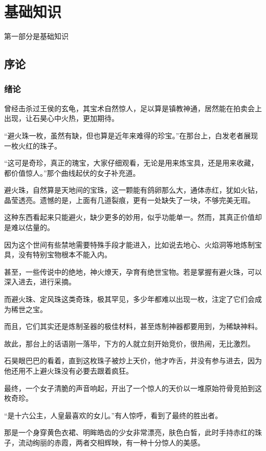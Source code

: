 \part{基础知识}

第一部分是基础知识

\chapter{序论}
\thispagestyle{empty}


\section{绪论}

曾经击杀过王侯的玄龟，其宝术自然惊人，足以算是镇教神通，居然能在拍卖会上出现，让石昊心中火热，更加期待。

“避火珠一枚，虽然有缺，但也算是近年来难得的珍宝。”在那台上，白发老者展现一枚火红的珠子。

“这可是奇珍，真正的瑰宝，大家仔细观看，无论是用来炼宝具，还是用来收藏，都价值惊人。”那个曲线起伏的女子补充道。

避火珠，自然算是天地间的宝珠，这一颗能有鸽卵那么大，通体赤红，犹如火钻，晶莹透亮。遗憾的是，上面有几道裂痕，更有一处缺失了一块，不够完美无瑕。

这种东西看起来只能避火，缺少更多的妙用，似乎功能单一。然而，其真正价值却是难以估量的。

因为这个世间有些禁地需要特殊手段才能进入，比如说去地心、火焰洞等地炼制宝具，没有特别宝物根本不能入内。

甚至，一些传说中的绝地，神火燎天，孕育有绝世宝物。若是掌握有避火珠，可以深入进去，进行采摘。

而避火珠、定风珠这类奇珠，极其罕见，多少年都难以出现一枚，注定了它们会成为稀世之宝。

而且，它们其实还是炼制圣器的极佳材料，甚至炼制神器都要用到，为稀缺神料。

故此，那台上的话语刚一落毕，下方的人就立刻开始竞价，很热闹，无比激烈。

石昊眼巴巴的看着，直到这枚珠子被炒上天价，他才咋舌，并没有参与进去，因为他还用不上避火珠没有必要去跟着疯狂。

最终，一个女子清脆的声音响起，开出了一个惊人的天价以一堆原始符骨竞拍到这枚奇珍。

“是十六公主，人皇最喜欢的女儿。”有人惊呼，看到了最终的胜出者。

那是一个身穿黄色衣裙、明眸皓齿的少女非常漂亮，肤色白皙，此时手持赤红的珠子，流动绚丽的赤霞，两者交相辉映，有一种十分惊人的美感。

